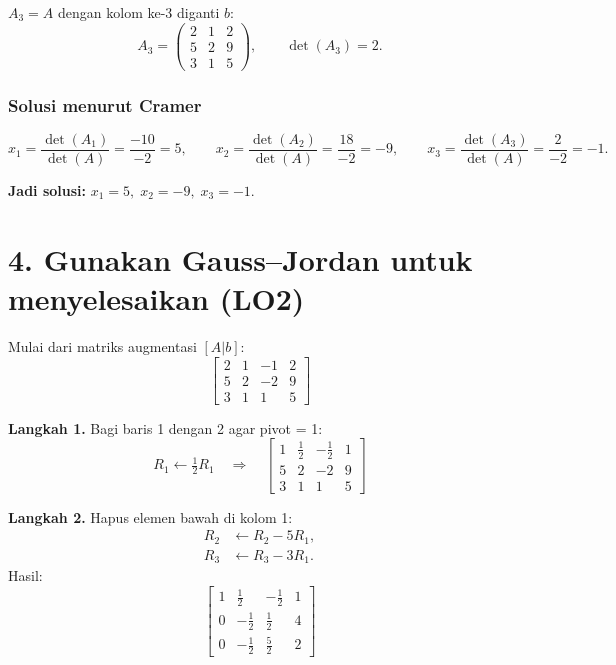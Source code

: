 \documentclass[12pt]{article}
\begin{document}
    \item $A_3 = A$ dengan kolom ke-3 diganti $b$:
    \[
    A_3 = \begin{pmatrix}
    2 & 1 & 2 \\
    5 & 2 & 9 \\
    3 & 1 & 5
    \end{pmatrix},
    \qquad \det(A_3) = 2.
    \]

\subsubsection*{Solusi menurut Cramer}
\[
x_1=\frac{\det(A_1)}{\det(A)}=\frac{-10}{-2}=5,\qquad
x_2=\frac{\det(A_2)}{\det(A)}=\frac{18}{-2}=-9,\qquad
x_3=\frac{\det(A_3)}{\det(A)}=\frac{2}{-2}=-1.
\]

\textbf{Jadi solusi:} $\boxed{x_1=5,\; x_2=-9,\; x_3=-1}$.

\section*{4. Gunakan Gauss–Jordan untuk menyelesaikan (LO2)}

Mulai dari matriks augmentasi $[A|b]$:
\[
\left[\begin{array}{ccc|c}
2 & 1 & -1 & 2 \\[4pt]
5 & 2 & -2 & 9 \\[4pt]
3 & 1 & 1 & 5
\end{array}\right]
\]

\textbf{Langkah 1.} Bagi baris 1 dengan 2 agar pivot = 1:
\[
R_1 \leftarrow \tfrac{1}{2}R_1
\quad\Rightarrow\quad
\left[\begin{array}{ccc|c}
1 & \tfrac{1}{2} & -\tfrac{1}{2} & 1 \\[4pt]
5 & 2 & -2 & 9 \\[4pt]
3 & 1 & 1 & 5
\end{array}\right]
\]

\textbf{Langkah 2.} Hapus elemen bawah di kolom 1:
\[
\begin{aligned}
R_2 &\leftarrow R_2 - 5R_1,\\
R_3 &\leftarrow R_3 - 3R_1.
\end{aligned}
\]
Hasil:
\[
\left[\begin{array}{ccc|c}
1 & \tfrac{1}{2} & -\tfrac{1}{2} & 1 \\[4pt]
0 & -\tfrac{1}{2} & \tfrac{1}{2} & 4 \\[4pt]
0 & -\tfrac{1}{2} & \tfrac{5}{2} & 2
\end{array}\right]
\]
\end{document}
